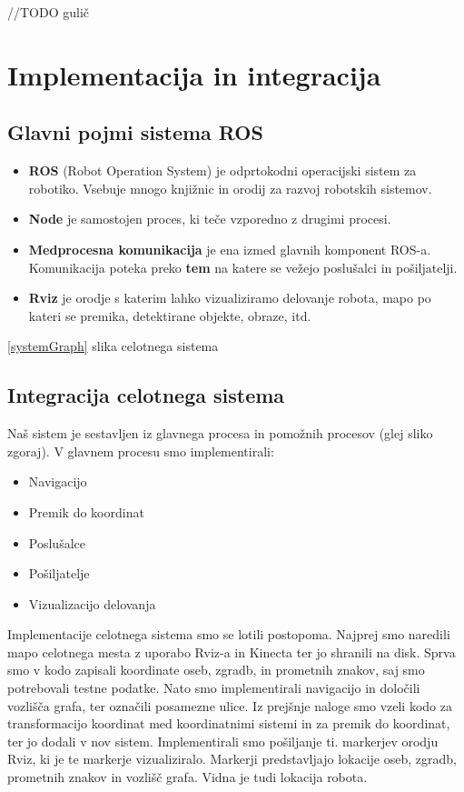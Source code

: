 \documentclass[a4paper,11pt]{article}
\begin{document}
//TODO gulič


\section{Implementacija in integracija}

\subsection{Glavni pojmi sistema ROS}

\begin{itemize}
\item \textbf{ROS} (Robot Operation System) je odprtokodni operacijski sistem za robotiko. Vsebuje mnogo knjižnic in orodij za razvoj robotskih sistemov.
\item \textbf{Node} je samostojen proces, ki teče vzporedno z drugimi procesi.
\item \textbf{Medprocesna komunikacija} je ena izmed glavnih komponent ROS-a. Komunikacija poteka preko \textbf{tem} na katere se vežejo poslušalci in pošiljatelji. 
\item \textbf{Rviz} je orodje s katerim lahko vizualiziramo delovanje robota, mapo po kateri se premika, detektirane objekte, obraze, itd.
\end{itemize}

 \ref{systemGraph}{  slika celotnega sistema}

\subsection{Integracija celotnega sistema}

Naš sistem je sestavljen iz glavnega procesa in pomožnih procesov (glej sliko zgoraj). V glavnem procesu smo implementirali:
\begin{itemize}
\item Navigacijo
\item Premik do koordinat
\item Poslušalce
\item Pošiljatelje
\item Vizualizacijo delovanja
\end{itemize}

Implementacije celotnega sistema smo se lotili postopoma. Najprej smo naredili mapo celotnega mesta z uporabo Rviz-a in Kinecta ter jo shranili na disk. Sprva smo v kodo zapisali koordinate oseb, zgradb, in prometnih znakov, saj smo potrebovali testne podatke. Nato smo implementirali navigacijo in določili vozlišča grafa, ter označili posamezne ulice. Iz prejšnje naloge smo vzeli kodo za transformacijo koordinat med koordinatnimi sistemi in za premik do koordinat, ter jo dodali v nov sistem. Implementirali smo pošiljanje ti. markerjev orodju Rviz, ki je te markerje vizualiziralo. Markerji predstavljajo lokacije oseb, zgradb, prometnih znakov in vozlišč grafa. Vidna je tudi lokacija robota.
\end{document}
